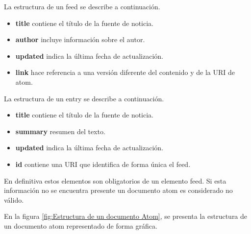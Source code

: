 La estructura de un feed se describe a continuación.

\begin{itemize}

\item \textbf{title} contiene el título de la fuente de noticia.
\item \textbf{author} incluye información sobre el autor.
\item \textbf{updated} indica la última fecha de actualización.
\item \textbf{link} hace referencia a una versión diferente del contenido
y de la URI de atom.

\end{itemize}

La estructura de un entry se describe a continuación.

\begin{itemize}

\item \textbf{title} contiene el título de la fuente de noticia.
\item \textbf{summary} resumen del texto.
\item \textbf{updated} indica la última fecha de actualización.
\item \textbf{id} contiene una URI que identifica de forma única el feed.

\end{itemize}

En definitiva estos elementos son obligatorios de un elemento feed. Si esta
información no se encuentra presente un documento atom es considerado no
válido. \cite{wittenbrink2005rss}

En la figura \ref{fig:Estructura de un documento Atom}, se presenta la
estructura de un documento atom representado de forma gráfica.

\begin{minipage}{1.0\linewidth}
	\centering
	\label{fig:Estructura de un documento Atom}
\end{minipage}